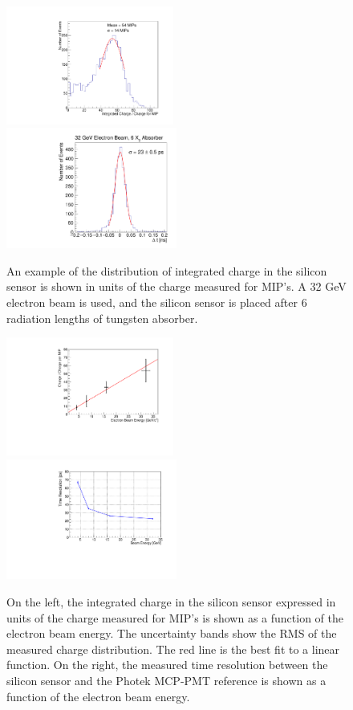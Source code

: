 \documentclass[12pt]{article}
\begin{document}
{\begin{figure}[htbp] 
\centering
\includegraphics[width=0.49\textwidth]{plots/Electron_6X0_32GeV_chargeMIP.pdf} 
\includegraphics[width=0.50\textwidth]{plots/deltaT_32GeV_6X0.pdf} 
\caption{ An example of the distribution of integrated charge in the silicon sensor is 
shown in units of the charge measured for MIP's. A 32 GeV electron beam is used, and the
silicon sensor is placed after 6 radiation lengths of tungsten absorber.} 
\label{fig:ChargeDistributionExample}
\end{figure}

\begin{figure}[htbp] 
\centering
\includegraphics[width=0.49\textwidth]{plots/MIPVsEnergyAt6X0.pdf} 
\includegraphics[width=0.50\textwidth]{plots/SigmaT_vs_BeamEnergy_lin30Stamp.pdf} 
\caption{On the left, the integrated charge in the silicon sensor expressed in units of the 
charge measured for MIP's is shown as a function of the electron beam energy. The uncertainty
bands show the RMS of the measured charge distribution. The red line is the best fit to a 
linear function. On the right, the measured time resolution between the silicon sensor and the 
Photek MCP-PMT reference is shown as a function of the electron beam energy.
} 
\label{fig:MIPVsEnergy} 
\end{figure} 

}
\end{document}
